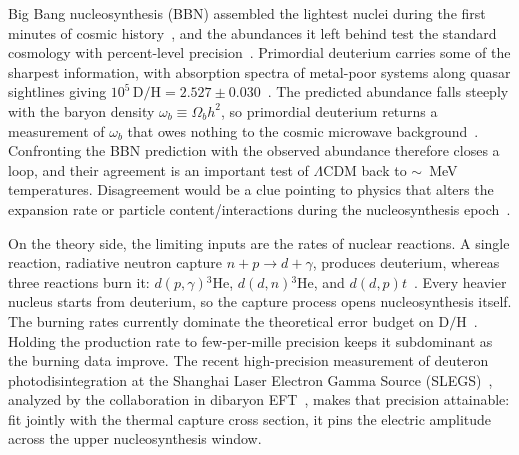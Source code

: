 \documentclass[
  aps,prd,twocolumn,nofootinbib,superscriptaddress,
  longbibliography,floatfix,preprintnumbers
]{revtex4-2}
\newcommand{\npdg}{n+p\to d+\gamma}
\begin{document}
Big Bang nucleosynthesis (BBN) assembled the lightest nuclei during the first
minutes of cosmic history~\cite{Alpher:1948ve,Wagoner:1966pv}, and the abundances it
left behind test the standard cosmology with percent-level
precision~\cite{Cyburt:2015mya,Pitrou:2018cgg}. Primordial deuterium carries some of the sharpest
information, with absorption spectra of metal-poor systems along quasar sightlines
giving $10^{5}\,\mathrm{D/H}=2.527\pm0.030$~\cite{Cooke:2017cwo}. The predicted
abundance falls steeply with the baryon density $\omega_b\equiv\Omega_bh^2$, so
primordial deuterium returns a measurement of $\omega_b$ that owes nothing to
the cosmic microwave background~\cite{Planck:2018vyg}. Confronting the BBN
prediction with the observed abundance therefore closes a loop, and their agreement is an important test of
$\Lambda$CDM back to $\sim$~MeV temperatures. Disagreement would be a clue pointing to physics that alters the expansion rate
or particle content/interactions during the nucleosynthesis epoch~\cite{Pospelov:2010hj}.

On the theory side, the limiting inputs are the rates of nuclear reactions. A
single reaction, radiative neutron capture $\npdg$, produces deuterium, whereas three
reactions burn it: $d(p,\gamma){}^3\mathrm{He}$, $d(d,n){}^3\mathrm{He}$, and
$d(d,p)t$~\cite{Cyburt:2015mya,Yeh:2020mgl}. Every heavier nucleus starts from
deuterium, so the capture process opens nucleosynthesis itself. The burning rates
currently dominate the theoretical error budget on
$\mathrm{D/H}$~\cite{Mossa:2020gjc,Pitrou:2020etk,Pisanti:2020efz,Launders:2026ciu}.
Holding the production rate to few-per-mille precision keeps it subdominant as
the burning data improve. The recent high-precision measurement of deuteron
photodisintegration at the Shanghai Laser Electron Gamma Source
(SLEGS)~\cite{Chen:2025oyj}, analyzed by the collaboration in dibaryon
EFT~\cite{Ando:2005cz}, makes that precision attainable: fit jointly with the
thermal capture cross section, it pins the electric amplitude across the upper
nucleosynthesis window.
\end{document}
